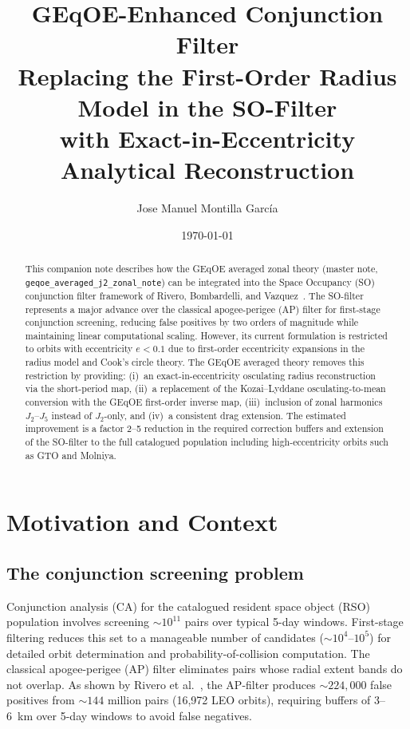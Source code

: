 \documentclass[11pt]{article}
\title{GEqOE-Enhanced Conjunction Filter\\
\large Replacing the First-Order Radius Model in the SO-Filter\\
with Exact-in-Eccentricity Analytical Reconstruction}
\author{Jose Manuel Montilla Garc\'ia}
\date{\today}
\newcommand{\master}{geqoe\_averaged\_j2\_zonal\_note}
\begin{document}
\maketitle

\begin{abstract}
This companion note describes how the GEqOE averaged zonal theory (master
note, \texttt{\master{}}) can be integrated into the Space Occupancy (SO)
conjunction filter framework of Rivero, Bombardelli, and
Vazquez~\cite{rivero2025}. The SO-filter represents a major advance over the
classical apogee-perigee (AP) filter for first-stage conjunction screening,
reducing false positives by two orders of magnitude while maintaining linear
computational scaling. However, its current formulation is restricted to
orbits with eccentricity $e < 0.1$ due to first-order eccentricity expansions
in the radius model and Cook's circle theory. The GEqOE averaged theory
removes this restriction by providing: (i)~an exact-in-eccentricity osculating
radius reconstruction via the short-period map, (ii)~a replacement of the
Kozai--Lyddane osculating-to-mean conversion with the GEqOE first-order
inverse map, (iii)~inclusion of zonal harmonics $J_2$--$J_5$ instead of
$J_2$-only, and (iv)~a consistent drag extension. The estimated improvement
is a factor 2--5 reduction in the required correction buffers and extension of
the SO-filter to the full catalogued population including high-eccentricity
orbits such as GTO and Molniya.
\end{abstract}

\tableofcontents

\section{Motivation and Context}
\label{sec:motivation}

\subsection{The conjunction screening problem}

Conjunction analysis (CA) for the catalogued resident space object (RSO)
population involves screening $\sim\!10^{11}$ pairs over typical 5-day
windows. First-stage filtering reduces this set to a manageable number of
candidates ($\sim\!10^4$--$10^5$) for detailed orbit determination and
probability-of-collision computation. The classical apogee-perigee (AP) filter
eliminates pairs whose radial extent bands do not overlap. As shown by
Rivero et al.~\cite{rivero2025}, the AP-filter produces $\sim\!224{,}000$
false positives from $\sim\!144$ million pairs (16,972 LEO orbits), requiring
buffers of 3--6~km over 5-day windows to avoid false negatives.
\end{document}
